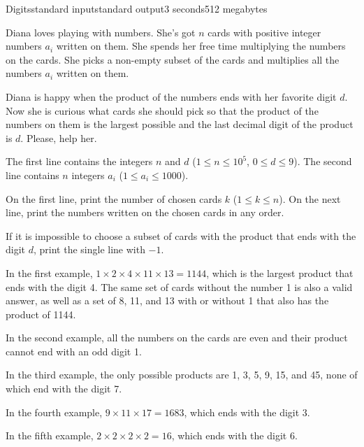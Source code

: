 \begin{problem}{Digits}{standard input}{standard output}{3 seconds}{512 megabytes}

Diana loves playing with numbers. She's got $n$ cards with positive integer numbers $a_i$ written on them. She spends her free time multiplying the numbers on the cards. She picks a 
non-empty subset of the cards and multiplies all the numbers $a_i$ written on them.

Diana is happy when the product of the numbers ends with her favorite digit $d$. Now she is curious what cards she should pick so that the product of the numbers on them is the largest possible and the last decimal digit of the product is $d$. Please, help her.


\InputFile
The first line contains the integers $n$ and $d$ ($1\le n\le 10^5$, $0\le d\le 9$). The second line contains $n$ integers $a_i$ ($1\le a_i\le 1000$). 

\OutputFile
On the first line, print the number of chosen cards $k$ ($1\le k\le n$). On the next line, print the numbers written on the chosen cards in any order. 

If it is impossible to choose a subset of cards with the product that ends with the digit $d$, print the single line with $-1$.

\Examples

\begin{example}
%
%
%
%
%
\end{example}

\Note
In the first example, $1 \times 2 \times 4 \times 11 \times 13 = 1144$, which is the largest product that ends with the digit 4. The same set of cards without the number 1 is also a valid answer, as well as a set of 8, 11, and 13 with or without 1 that also has the product of 1144.

In the second example, all the numbers on the cards are even and their product cannot end with an odd digit 1.

In the third example, the only possible products are 1, 3, 5, 9, 15, and 45, none of which end with the digit 7.

In the fourth example, $9 \times 11 \times 17 = 1683$, which ends with the digit 3. 

In the fifth example, $2 \times 2 \times 2 \times 2 = 16$, which ends with the digit 6.

\end{problem}


